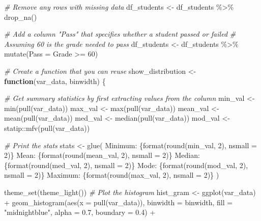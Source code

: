 \documentclass[
]{article}
\newenvironment{Shaded}{\begin{snugshade}}{\end{snugshade}}
\newcommand{\AttributeTok}[1]{\textcolor[rgb]{0.77,0.63,0.00}{#1}}
\newcommand{\CommentTok}[1]{\textcolor[rgb]{0.56,0.35,0.01}{\textit{#1}}}
\newcommand{\ControlFlowTok}[1]{\textcolor[rgb]{0.13,0.29,0.53}{\textbf{#1}}}
\newcommand{\DecValTok}[1]{\textcolor[rgb]{0.00,0.00,0.81}{#1}}
\newcommand{\FloatTok}[1]{\textcolor[rgb]{0.00,0.00,0.81}{#1}}
\newcommand{\FunctionTok}[1]{\textcolor[rgb]{0.00,0.00,0.00}{#1}}
\newcommand{\NormalTok}[1]{#1}
\newcommand{\OtherTok}[1]{\textcolor[rgb]{0.56,0.35,0.01}{#1}}
\newcommand{\SpecialCharTok}[1]{\textcolor[rgb]{0.00,0.00,0.00}{#1}}
\newcommand{\StringTok}[1]{\textcolor[rgb]{0.31,0.60,0.02}{#1}}
\begin{document}
\begin{Shaded}
\begin{Highlighting}[]
\CommentTok{\# Remove any rows with missing data}
\NormalTok{df\_students }\OtherTok{\textless{}{-}}\NormalTok{ df\_students }\SpecialCharTok{\%\textgreater{}\%} 
  \FunctionTok{drop\_na}\NormalTok{()}

\CommentTok{\# Add a column "Pass" that specifies whether a student passed or failed}
\CommentTok{\# Assuming \textquotesingle{}60\textquotesingle{} is the grade needed to pass}
\NormalTok{df\_students }\OtherTok{\textless{}{-}}\NormalTok{ df\_students }\SpecialCharTok{\%\textgreater{}\%} 
  \FunctionTok{mutate}\NormalTok{(}\AttributeTok{Pass =}\NormalTok{ Grade }\SpecialCharTok{\textgreater{}=} \DecValTok{60}\NormalTok{)}

\CommentTok{\# Create a function that you can reuse}
\NormalTok{show\_distribution }\OtherTok{\textless{}{-}} \ControlFlowTok{function}\NormalTok{(var\_data, binwidth) \{}
  
  \CommentTok{\# Get summary statistics by first extracting values from the column}
\NormalTok{  min\_val }\OtherTok{\textless{}{-}} \FunctionTok{min}\NormalTok{(}\FunctionTok{pull}\NormalTok{(var\_data))}
\NormalTok{  max\_val }\OtherTok{\textless{}{-}} \FunctionTok{max}\NormalTok{(}\FunctionTok{pull}\NormalTok{(var\_data))}
\NormalTok{  mean\_val }\OtherTok{\textless{}{-}} \FunctionTok{mean}\NormalTok{(}\FunctionTok{pull}\NormalTok{(var\_data))}
\NormalTok{  med\_val }\OtherTok{\textless{}{-}} \FunctionTok{median}\NormalTok{(}\FunctionTok{pull}\NormalTok{(var\_data))}
\NormalTok{  mod\_val }\OtherTok{\textless{}{-}}\NormalTok{ statip}\SpecialCharTok{::}\FunctionTok{mfv}\NormalTok{(}\FunctionTok{pull}\NormalTok{(var\_data))}

  \CommentTok{\# Print the stats}
\NormalTok{  stats }\OtherTok{\textless{}{-}} \FunctionTok{glue}\NormalTok{(}
  \StringTok{\textquotesingle{}Minimum: \{format(round(min\_val, 2), nsmall = 2)\}}
\StringTok{   Mean: \{format(round(mean\_val, 2), nsmall = 2)\}}
\StringTok{   Median: \{format(round(med\_val, 2), nsmall = 2)\}}
\StringTok{   Mode: \{format(round(mod\_val, 2), nsmall = 2)\}}
\StringTok{   Maximum: \{format(round(max\_val, 2), nsmall = 2)\}\textquotesingle{}}
\NormalTok{  )}
  
  \FunctionTok{theme\_set}\NormalTok{(}\FunctionTok{theme\_light}\NormalTok{())}
  \CommentTok{\# Plot the histogram}
\NormalTok{  hist\_gram }\OtherTok{\textless{}{-}} \FunctionTok{ggplot}\NormalTok{(var\_data) }\SpecialCharTok{+}
  \FunctionTok{geom\_histogram}\NormalTok{(}\FunctionTok{aes}\NormalTok{(}\AttributeTok{x =} \FunctionTok{pull}\NormalTok{(var\_data)), }\AttributeTok{binwidth =}\NormalTok{ binwidth,}
                 \AttributeTok{fill =} \StringTok{"midnightblue"}\NormalTok{, }\AttributeTok{alpha =} \FloatTok{0.7}\NormalTok{, }\AttributeTok{boundary =} \FloatTok{0.4}\NormalTok{) }\SpecialCharTok{+}
    

\end{Highlighting}
\end{Shaded}
\end{document}
